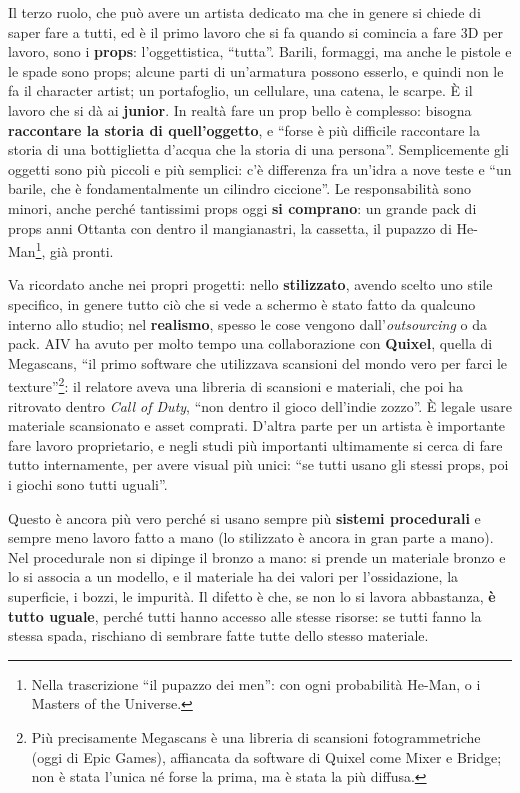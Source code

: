 Il terzo ruolo, che può avere un artista dedicato ma che in genere si chiede di
saper fare a tutti, ed è il primo lavoro che si fa quando si comincia a fare 3D
per lavoro, sono i \textbf{props}: l'oggettistica, ``tutta''. Barili, formaggi,
ma anche le pistole e le spade sono props; alcune parti di un'armatura possono
esserlo, e quindi non le fa il character artist; un portafoglio, un cellulare,
una catena, le scarpe. È il lavoro che si dà ai \textbf{junior}. In realtà
fare un prop bello è complesso: bisogna \textbf{raccontare la storia di
quell'oggetto}, e ``forse è più difficile raccontare la storia di una
bottiglietta d'acqua che la storia di una persona''. Semplicemente gli oggetti
sono più piccoli e più semplici: c'è differenza fra un'idra a nove teste e ``un
barile, che è fondamentalmente un cilindro ciccione''. Le responsabilità sono
minori, anche perché tantissimi props oggi \textbf{si comprano}: un grande pack
di props anni Ottanta con dentro il mangianastri, la cassetta, il pupazzo di
He-Man\footnote{Nella trascrizione ``il pupazzo dei men'': con ogni
probabilità He-Man, o i Masters of the Universe.}, già pronti.

Va ricordato anche nei propri progetti: nello \textbf{stilizzato}, avendo scelto
uno stile specifico, in genere tutto ciò che si vede a schermo è stato fatto da
qualcuno interno allo studio; nel \textbf{realismo}, spesso le cose vengono
dall'\emph{outsourcing} o da pack. AIV ha avuto per molto tempo una
collaborazione con \textbf{Quixel}, quella di Megascans, ``il primo software
che utilizzava scansioni del mondo vero per farci le texture''\footnote{Più
precisamente Megascans è una libreria di scansioni fotogrammetriche (oggi di
Epic Games), affiancata da software di Quixel come Mixer e Bridge; non è stata
l'unica né forse la prima, ma è stata la più diffusa.}: il relatore aveva una
libreria di scansioni e materiali, che poi ha ritrovato dentro \emph{Call of
Duty}, ``non dentro il gioco dell'indie zozzo''. È legale usare materiale
scansionato e asset comprati. D'altra parte per un artista è importante fare
lavoro proprietario, e negli studi più importanti ultimamente si cerca di fare
tutto internamente, per avere visual più unici: ``se tutti usano gli stessi
props, poi i giochi sono tutti uguali''.

Questo è ancora più vero perché si usano sempre più \textbf{sistemi
procedurali} e sempre meno lavoro fatto a mano (lo stilizzato è ancora in gran
parte a mano). Nel procedurale non si dipinge il bronzo a mano: si prende un
materiale bronzo e lo si associa a un modello, e il materiale ha dei valori per
l'ossidazione, la superficie, i bozzi, le impurità. Il difetto è che, se non lo
si lavora abbastanza, \textbf{è tutto uguale}, perché tutti hanno accesso alle
stesse risorse: se tutti fanno la stessa spada, rischiano di sembrare fatte
tutte dello stesso materiale.


